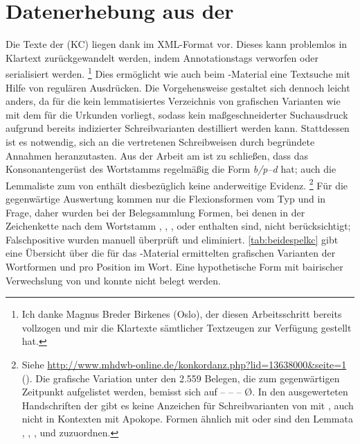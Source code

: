 
\section{Datenerhebung aus der }

Die Texte der \KC{} (KC) liegen dank 
\autocite{kcdigital} im XML-Format vor. Dieses kann problemlos in Klartext
zurückgewandelt werden, indem Annotationstags verworfen oder serialisiert
werden.%
%
	\footnote{Ich danke Magnus Breder Birkenes (Oslo), der diesen Arbeitsschritt
	bereits vollzogen und mir die Klartexte sämtlicher Textzeugen zur Verfügung
	gestellt hat.}
%
Dies ermöglicht wie auch beim \CAO{}-Material eine Textsuche mit Hilfe
von regulären Ausdrücken. Die Vorgehensweise gestaltet sich dennoch leicht
anders, da für die \KC{} kein lemmatisiertes Verzeichnis von grafischen
Varianten wie mit dem \citet{wmu} für die Urkunden vorliegt, sodass kein
maßgeschneiderter Suchausdruck aufgrund bereits indizierter Schreibvarianten
destilliert werden kann. Stattdessen ist es notwendig, sich an die vertretenen
Schreibweisen durch begründete Annahmen heranzutasten. Aus der Arbeit am
\CAO{} ist zu schließen, dass das Konsonantengerüst des Wortstamms
regelmäßig die Form \textit{b/p--d} hat; auch die Lemmaliste zum
 von \citeauthor{mwb1}
\autocite[\pno~]{mwb1} enthält diesbezüglich keine anderweitige
Evidenz.%
%
	\footnote{Siehe
		\url{http://www.mhdwb-online.de/konkordanz.php?lid=13638000&seite=1}
		(). Die grafische Variation unter den 2.559 Belegen,
		die zum gegenwärtigen Zeitpunkt aufgelistet werden, bemisst sich auf
		 --  --  --
		 Ø. In den
		ausgewerteten Handschriften der \KC{} gibt es keine Anzeichen für
		Schreibvarianten von  mit , auch nicht in
		Kontexten mit Apokope. Formen ähnlich  mit  oder
		 sind den Lemmata  ,
		 ,  ,
		  und  
		zuzuordnen.}
%
Für die gegenwärtige Auswertung kommen nur die Flexionsformen vom Typ 
und  in Frage, daher wurden bei der Belegsammlung Formen, bei denen
in der Zeichenkette nach dem Wortstamm , , , 
oder  enthalten sind, nicht berücksichtigt; Falschpositive wurden
manuell überprüft und eliminiert. \cref{tab:beidespelkc} gibt eine Übersicht
über die für das \KC{}-Material ermittelten grafischen Varianten der
Wortformen  und  pro Position im Wort. Eine
hypothetische Form  mit bairischer Verwechslung von  und
 \autocite[153]{paul2007} konnte nicht belegt werden.

